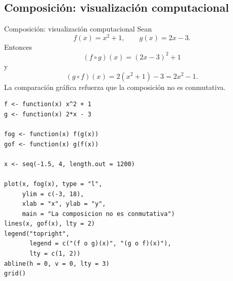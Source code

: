\documentclass[aspectratio=169,10pt]{beamer}
\begin{document}
\subsection{Composición: visualización computacional}
\begin{frame}{Composición: visualización computacional}
Sean
\[
f(x)=x^2+1,\qquad g(x)=2x-3.
\]
Entonces
\[
(f\circ g)(x)=(2x-3)^2+1
\]
y
\[
(g\circ f)(x)=2(x^2+1)-3=2x^2-1.
\]
La comparación gráfica refuerza que la composición no es conmutativa.

\begin{center}
\end{center}

\begin{verbatim}
f <- function(x) x^2 + 1
g <- function(x) 2*x - 3

fog <- function(x) f(g(x))
gof <- function(x) g(f(x))

x <- seq(-1.5, 4, length.out = 1200)

plot(x, fog(x), type = "l",
     ylim = c(-3, 18),
     xlab = "x", ylab = "y",
     main = "La composicion no es conmutativa")
lines(x, gof(x), lty = 2)
legend("topright",
       legend = c("(f o g)(x)", "(g o f)(x)"),
       lty = c(1, 2))
abline(h = 0, v = 0, lty = 3)
grid()
\end{verbatim}

\end{frame}
\end{document}
